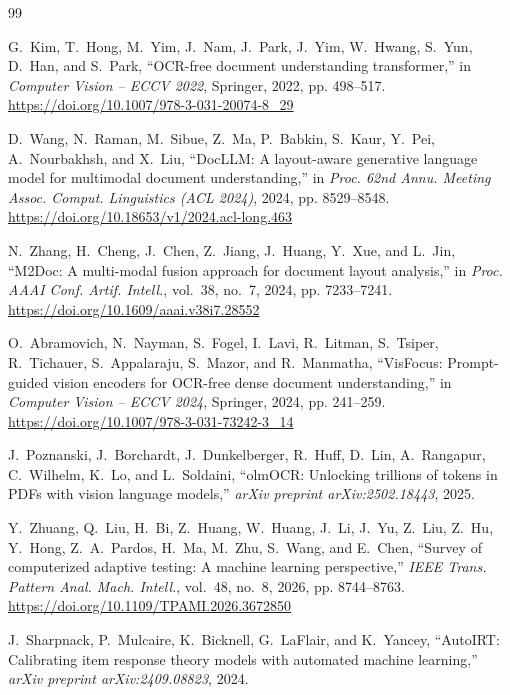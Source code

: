 \documentclass[conference]{IEEEtran}
\begin{document}
\begin{thebibliography}{99}

G.~Kim, T.~Hong, M.~Yim, J.~Nam, J.~Park, J.~Yim, W.~Hwang, S.~Yun, D.~Han, and S.~Park, ``OCR-free document understanding transformer,'' in \emph{Computer Vision -- ECCV 2022}, Springer, 2022, pp. 498--517. \url{https://doi.org/10.1007/978-3-031-20074-8_29}

D.~Wang, N.~Raman, M.~Sibue, Z.~Ma, P.~Babkin, S.~Kaur, Y.~Pei, A.~Nourbakhsh, and X.~Liu, ``DocLLM: A layout-aware generative language model for multimodal document understanding,'' in \emph{Proc. 62nd Annu. Meeting Assoc. Comput. Linguistics (ACL 2024)}, 2024, pp. 8529--8548. \url{https://doi.org/10.18653/v1/2024.acl-long.463}

N.~Zhang, H.~Cheng, J.~Chen, Z.~Jiang, J.~Huang, Y.~Xue, and L.~Jin, ``M2Doc: A multi-modal fusion approach for document layout analysis,'' in \emph{Proc. AAAI Conf. Artif. Intell.}, vol.~38, no.~7, 2024, pp. 7233--7241. \url{https://doi.org/10.1609/aaai.v38i7.28552}

O.~Abramovich, N.~Nayman, S.~Fogel, I.~Lavi, R.~Litman, S.~Tsiper, R.~Tichauer, S.~Appalaraju, S.~Mazor, and R.~Manmatha, ``VisFocus: Prompt-guided vision encoders for OCR-free dense document understanding,'' in \emph{Computer Vision -- ECCV 2024}, Springer, 2024, pp. 241--259. \url{https://doi.org/10.1007/978-3-031-73242-3_14}

J.~Poznanski, J.~Borchardt, J.~Dunkelberger, R.~Huff, D.~Lin, A.~Rangapur, C.~Wilhelm, K.~Lo, and L.~Soldaini, ``olmOCR: Unlocking trillions of tokens in PDFs with vision language models,'' \emph{arXiv preprint arXiv:2502.18443}, 2025.

Y.~Zhuang, Q.~Liu, H.~Bi, Z.~Huang, W.~Huang, J.~Li, J.~Yu, Z.~Liu, Z.~Hu, Y.~Hong, Z.~A.~Pardos, H.~Ma, M.~Zhu, S.~Wang, and E.~Chen, ``Survey of computerized adaptive testing: A machine learning perspective,'' \emph{IEEE Trans. Pattern Anal. Mach. Intell.}, vol.~48, no.~8, 2026, pp. 8744--8763. \url{https://doi.org/10.1109/TPAMI.2026.3672850}

J.~Sharpnack, P.~Mulcaire, K.~Bicknell, G.~LaFlair, and K.~Yancey, ``AutoIRT: Calibrating item response theory models with automated machine learning,'' \emph{arXiv preprint arXiv:2409.08823}, 2024.


\end{thebibliography}
\end{document}

